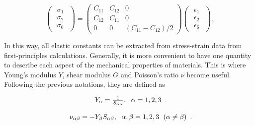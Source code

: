 \begin{equation}
\begin{pmatrix} \begin{array}{c} \sigma_1 \\ \sigma_2 \\ \sigma_6 \end{array} 
\end{pmatrix}
=
 \begin{pmatrix}
  C_{11} & C_{12} & 0  \\
  C_{12} & C_{11} & 0  \\
  0 & 0 & (C_{11}-C_{12})/2
 \end{pmatrix}
 \begin{pmatrix} \begin{array}{c} \epsilon_1 \\ \epsilon_2 \\ \epsilon_6 
\end{array} \end{pmatrix}.
\end{equation} 

In this way, all elastic constants can be extracted from stress-strain data from first-principles calculations. Generally, it is more convenient to have one quantity to describe each aspect of the mechanical properties of materials. This is where Young's modulus $Y$, shear modulus $G$ and Poisson's ratio $\nu$ become useful. Following the previous notations, they are defined as 

\begin{equation}
\begin{array}{c}

Y_\alpha=\frac{1}{S_{\alpha\alpha}},\hspace{6 pt} \alpha = 1, 2, 3
\end{array}.
\end{equation}

\begin{equation}
\begin{array}{c}
\nu_{\alpha\beta}=-Y_\beta S_{\alpha\beta},\hspace{6 pt} \alpha, \beta = 1, 2, 3 
\hspace{6 pt}(\alpha\neq\beta)
\end{array}.
\end{equation}


